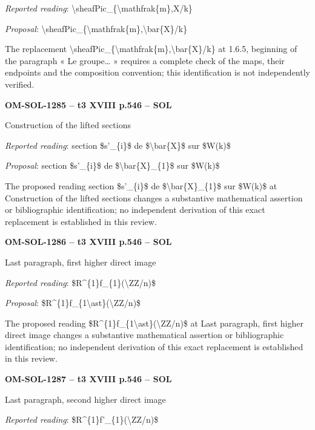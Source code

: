 \emph{Reported reading}: \textbackslash{}sheafPic\_\{\textbackslash{}mathfrak\{m\},X/k\}\par
\emph{Proposal}: \textbackslash{}sheafPic\_\{\textbackslash{}mathfrak\{m\},\textbackslash{}bar\{X\}/k\}\par
The replacement \textbackslash{}sheafPic\_\{\textbackslash{}mathfrak\{m\},\textbackslash{}bar\{X\}/k\} at 1.6.5, beginning of the paragraph « Le groupe… » requires a complete check of the maps, their endpoints and the composition convention; this identification is not independently verified.\par
\par\noindent\textbf{OM-SOL-1285 -- t3 XVIII p.546 -- SOL}\par
Construction of the lifted sections\par
\emph{Reported reading}: section \$s'\_\{i\}\$ de \$\textbackslash{}bar\{X\}\$ sur \$W(k)\$\par
\emph{Proposal}: section \$s'\_\{i\}\$ de \$\textbackslash{}bar\{X\}\_\{1\}\$ sur \$W(k)\$\par
The proposed reading section \$s'\_\{i\}\$ de \$\textbackslash{}bar\{X\}\_\{1\}\$ sur \$W(k)\$ at Construction of the lifted sections changes a substantive mathematical assertion or bibliographic identification; no independent derivation of this exact replacement is established in this review.\par
\par\noindent\textbf{OM-SOL-1286 -- t3 XVIII p.546 -- SOL}\par
Last paragraph, first higher direct image\par
\emph{Reported reading}: \$R\textasciicircum{}\{1\}f\_\{1\}(\textbackslash{}ZZ/n)\$\par
\emph{Proposal}: \$R\textasciicircum{}\{1\}f\_\{1\textbackslash{}ast\}(\textbackslash{}ZZ/n)\$\par
The proposed reading \$R\textasciicircum{}\{1\}f\_\{1\textbackslash{}ast\}(\textbackslash{}ZZ/n)\$ at Last paragraph, first higher direct image changes a substantive mathematical assertion or bibliographic identification; no independent derivation of this exact replacement is established in this review.\par
\par\noindent\textbf{OM-SOL-1287 -- t3 XVIII p.546 -- SOL}\par
Last paragraph, second higher direct image\par
\emph{Reported reading}: \$R\textasciicircum{}\{1\}f'\_\{1\}(\textbackslash{}ZZ/n)\$\par
